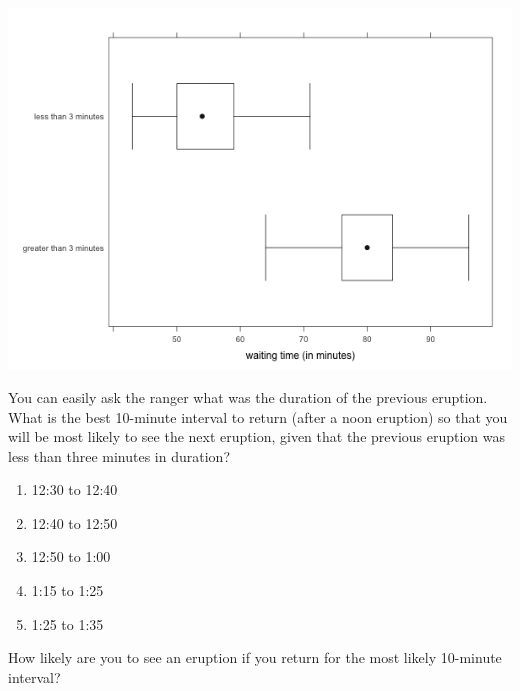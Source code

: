 \noindent


\begin{marginfigure}
\centering
\includegraphics{includes/faithful2.png}
\end{marginfigure}





You can easily ask the ranger what was the duration of the previous
eruption. 
What is the best 10-minute interval to return (after a noon eruption)
so that you will be most likely to see the next eruption, given that
the previous eruption was less than three minutes in duration?





\begin{enumerate}[leftmargin=1cm, itemsep=.1em]


\item 12:30 to 12:40


\item 12:40 to 12:50


\item 12:50 to 1:00


\item 1:15 to 1:25


\item 1:25 to 1:35


\end{enumerate}








\noindent


How likely are you to see an eruption if you return for the most
likely 10-minute interval?





